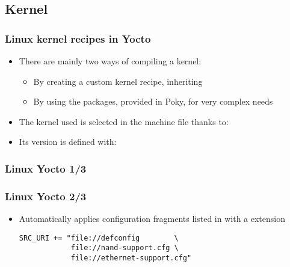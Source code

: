 \subsection{Kernel}

\begin{frame}
  \frametitle{Linux kernel recipes in Yocto}
  \begin{itemize}
    \item There are mainly two ways of compiling a kernel:
      \begin{itemize}
        \item By creating a custom kernel recipe, inheriting
        \item By using the  packages, provided in
          Poky, for very complex needs
      \end{itemize}
    \item The kernel used is selected in the machine file thanks to:
    \item Its version is defined with:
  \end{itemize}
\end{frame}

\begin{frame}[fragile]
  \frametitle{Linux Yocto 1/3}
\end{frame}

\begin{frame}[fragile]
  \frametitle{Linux Yocto 2/3}
  \begin{itemize}
    \item Automatically applies configuration fragments listed in  with a  extension
      \begin{block}{}
        \begin{verbatim}
SRC_URI += "file://defconfig        \
            file://nand-support.cfg \
            file://ethernet-support.cfg"
        \end{verbatim}
      \end{block}
  \end{itemize}
\end{frame}

